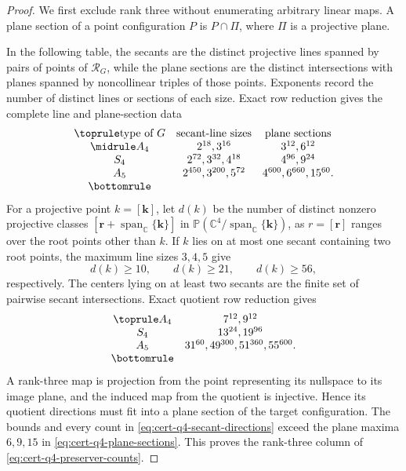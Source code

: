 \documentclass[11pt,letterpaper,onecolumn]{article}
\theoremstyle{plain}
\theoremstyle{definition}
\theoremstyle{remark}
\newcommand{\Span}{\operatorname{span}}
\begin{document}
\begin{proof}
We first exclude rank three without enumerating arbitrary linear maps.
A plane section of a point configuration \(P\) is \(P\cap\Pi\), where
\(\Pi\) is a projective plane.

In the following table, the secants are the distinct projective lines
spanned by pairs of points of \(\mathcal R_G\), while the plane sections
are the distinct intersections with planes spanned by noncollinear triples
of those points. Exponents record the number of distinct lines or sections
of each size.
Exact row reduction gives the complete line and plane-section data
\begin{equation}
\begin{array}{ccc}
\toprule
\text{type of }G&\text{secant-line sizes}&\text{plane sections}\\ \midrule
A_4&2^{18},3^{16}&3^{12},6^{12}\\
S_4&2^{72},3^{32},4^{18}&4^{96},9^{24}\\
A_5&2^{450},3^{200},5^{72}&4^{600},6^{660},15^{60}.\\
\bottomrule
\end{array}
\label{eq:cert-q4-plane-sections}
\end{equation}
For a projective point \(k=[\mathbf k]\), let \(d(k)\) be the number of
distinct nonzero projective classes
\([\mathbf r+\Span_{\mathbb C}\{\mathbf k\}]\) in
\(\mathbb P(\mathbb C^4/\Span_{\mathbb C}\{\mathbf k\})\), as
\(r=[\mathbf r]\) ranges over the root points other than \(k\).  If
\(k\) lies on at
most one secant containing two root
points, the maximum line sizes \(3,4,5\) give
\begin{equation*}
 d(k)\ge10,\qquad d(k)\ge21,\qquad d(k)\ge56,
\end{equation*}
respectively.  The centers lying on at least two secants are the finite
set of pairwise secant intersections.  Exact quotient row reduction gives
\begin{equation}
\begin{array}{cc}
\toprule
A_4&7^{12},9^{12}\\
S_4&13^{24},19^{96}\\
A_5&31^{60},49^{300},51^{360},55^{600}.\\
\bottomrule
\end{array}
\label{eq:cert-q4-secant-directions}
\end{equation}
A rank-three map is projection from the point representing its nullspace to its image plane,
and the induced map from the quotient is injective.  Hence its quotient
directions must fit into a plane section of the target configuration.
The bounds and every count in \cref{eq:cert-q4-secant-directions} exceed
the plane maxima \(6,9,15\) in \cref{eq:cert-q4-plane-sections}.  This
proves the rank-three column of \cref{eq:cert-q4-preserver-counts}.


\end{proof}
\end{document}
